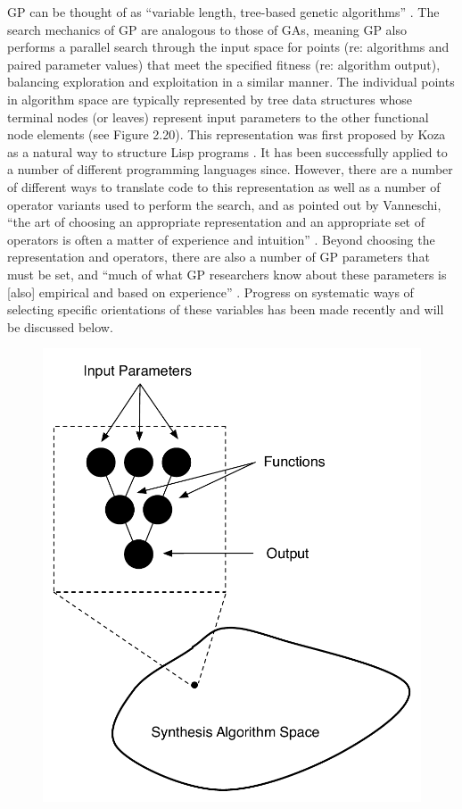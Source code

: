 \documentclass[a4paper,12pt]{report} 	%
\numberwithin{figure}{chapter}
\numberwithin{table}{chapter}
\numberwithin{equation}{chapter}
\begin{document}
\begin{flushleft}
GP can be thought of as ``variable length, tree-based genetic algorithms'' \cite[p. 29]{Teller:1998ly}. The search mechanics of GP are analogous to those of GAs, meaning GP also performs a parallel search through the input space for points (re: algorithms and paired parameter values) that meet the specified fitness (re: algorithm output), balancing exploration and exploitation in a similar manner. The individual points in algorithm space are typically represented by tree data structures whose terminal nodes (or leaves) represent input parameters to the other functional node elements (see Figure 2.20). This representation was first proposed by Koza as a natural way to structure Lisp programs \cite{Koza:1992gp}. It has been successfully applied to a number of different programming languages since. However, there are a number of different ways to translate code to this representation as well as a number of operator variants  used to perform the search, and as pointed out by Vanneschi, ``the art of choosing an appropriate representation and an appropriate set of operators is often a matter of experience and intuition'' \cite[p. 6]{Vanneschi:2004le}. Beyond choosing the representation and operators, there are also a number of GP parameters that must be set, and ``much of what GP researchers know about these parameters is [also] empirical and based on experience'' \cite[p. 32]{Vanneschi:2004le}. Progress on systematic ways of selecting specific orientations of these variables has been made recently and will be discussed below.
\\
\begin{figure}[h!]
\begin{center}
\includegraphics[scale=0.70]{GraphAsPoint}

\end{center}
\end{figure}
\end{flushleft}
\end{document}
